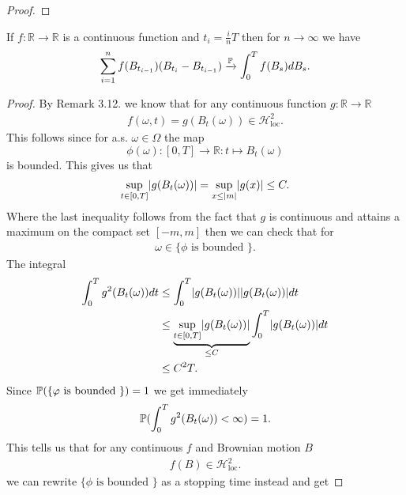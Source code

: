 \begin{proof}
  
\end{proof}
\begin{Theorem}
 If $f : \mathbb{R} \to \mathbb{R} $  is a continuous function and  $t_i = \frac{i}{n}T$ then for $n\to \infty$ we have
 \begin{align*}
   \sum_{i=1}^{n} f(B_{t_{i-1}})(B_{t_i}-B_{t_{i-1}}) \xrightarrow{\P} \int_0^{T} f(B_s) dB_s
 .\end{align*}
\end{Theorem}
\begin{proof}
By Remark 3.12. we know that for any continuous function $g : \mathbb{R} \to  \mathbb{R}$ 
\begin{align*}
  f(\omega ,t) = g(B_t(\omega )) \in  \mathcal{H}^{2}_{\text{loc}} 
.\end{align*}
This follows since for a.s. $\omega  \in  \Omega $ the map 
\[\phi(\omega ) : [0,T] \to  \mathbb{R} : t \mapsto B_t(\omega )\]
is bounded. This gives us that 
\begin{align*}
  \sup_{t \in  [0,T]} \abs{g(B_t(\omega ))} = \sup_{x \le \abs{m}} \abs{g(x)} \le  C
.\end{align*}
Where the last inequality follows from the fact that $g$ is continuous and attains a maximum on the compact set $[-m,m]$ then we can check that 
for 
\begin{align*}
  \omega  \in  \{\phi \text{ is bounded } \}  
.\end{align*}
The integral 
\begin{align*}
  \int_0^{T}  g^2(B_t(\omega )) dt &\le  \int_0^{T}  \abs{g(B_t(\omega ))}\abs{g(B_t(\omega ))} dt\\
                                   &\le  \underbrace{\sup_{t \in [0,T]} \abs{g(B_t(\omega ))}}_{\le C} \int_0^{T}  \abs{g(B_t(\omega ))} dt\\
                                   &\le  C^2T
.\end{align*}
Since $\P(\{\phi \text{ is bounded } \}) = 1$ we get  immediately 
\begin{align*}
  \P(\int_0^{T} g^2(B_t(\omega ))  < \infty) = 1
.\end{align*}
This tells us that  for any continuous $f$ and Brownian motion $B$ 
\begin{align*}
  f(B) \in  \mathcal{H}_{\text{loc}}^2
.\end{align*}
we can rewrite $\{\phi \text{ is bounded } \}$ as a stopping time instead and get 

\end{proof}
